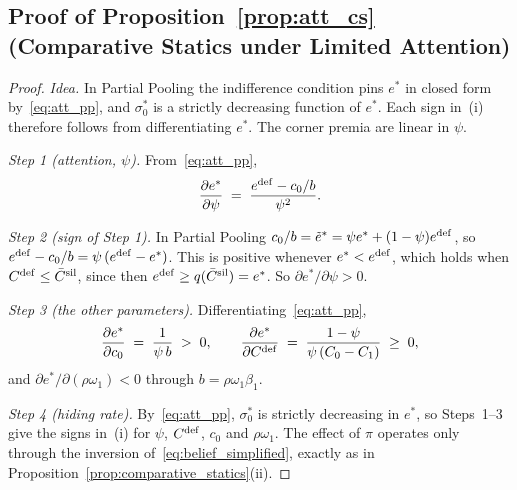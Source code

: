 \subsection*{Proof of Proposition~\ref{prop:att_cs} (Comparative Statics under Limited Attention)}

\begin{proof}\upshape
\emph{Idea.} In Partial Pooling the indifference condition pins $e^*$ in closed form by~\eqref{eq:att_pp}, and $\sigma_0^*$ is a strictly decreasing function of $e^*$. Each sign in~(i) therefore follows from differentiating $e^*$. The corner premia are linear in $\psi$.

\emph{Step 1 (attention, $\psi$).} From~\eqref{eq:att_pp},
\begin{equation*}
    \frac{\partial e^*}{\partial\psi}\;=\;\frac{e^{\rm def}-c_0/b}{\psi^2}.
\end{equation*}

\emph{Step 2 (sign of Step 1).} In Partial Pooling $c_0/b=\tilde e^*=\psi e^*+(1-\psi)e^{\rm def}$, so $e^{\rm def}-c_0/b=\psi\,(e^{\rm def}-e^*)$. This is positive whenever $e^*<e^{\rm def}$, which holds when $C^{\rm def}\le\bar C^{\rm sil}$, since then $e^{\rm def}\ge q(\bar C^{\rm sil})=e^*$. So $\partial e^*/\partial\psi>0$.

\emph{Step 3 (the other parameters).} Differentiating~\eqref{eq:att_pp},
\begin{equation*}
    \frac{\partial e^*}{\partial c_0}\;=\;\frac{1}{\psi\,b}\;>\;0,\qquad
    \frac{\partial e^*}{\partial C^{\rm def}}\;=\;\frac{1-\psi}{\psi\,(C_0-C_1)}\;\ge\;0,
\end{equation*}
and $\partial e^*/\partial(\rho\omega_1)<0$ through $b=\rho\omega_1\beta_1$.

\emph{Step 4 (hiding rate).} By~\eqref{eq:att_pp}, $\sigma_0^*$ is strictly decreasing in $e^*$, so Steps~1--3 give the signs in~(i) for $\psi$, $C^{\rm def}$, $c_0$ and $\rho\omega_1$. The effect of $\pi$ operates only through the inversion of~\eqref{eq:belief_simplified}, exactly as in Proposition~\ref{prop:comparative_statics}(ii).


\end{proof}
